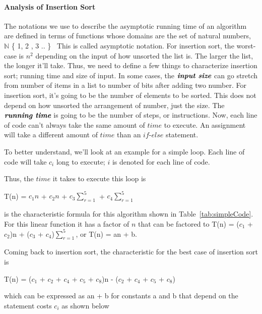 \documentclass[12pt]{article}
\begin{document}
	\paragraph{Analysis of Insertion Sort}
	
	The notations we use to describe the asymptotic running time of an algorithm are defined in terms of functions whose domains are the set of natural numbers, $\mathbb{N}$ \{ 1, 2 , 3 .. \}~\cite[p.~43]{intro}
	This is called asymptotic notation.
	For insertion sort, the worst-case is $n^2$ depending on the input of how unsorted the list is.
	The larger the list, the longer it'll take. Thus, we need to define a few things to characterize insertion sort; running time and size of input.
	In some cases, the $\textit{\textbf{input size}}$ can go stretch from number of items in a list to number of bits after adding two number. 
	For insertion sort, it’s going to be the number of elements to be sorted.
	This does not depend on how unsorted the arrangement of number, just the size.
	The $\textit{\textbf{running time}}$ is going to be the number of steps, or instructions.
	Now, each line of code can't always take the same amount of $\textit{time}$ to execute.
	An assignment will take a different amount of $\textit{time}$ than an $\textit{if-else}$ statement.
	
	To better understand, we’ll look at an example for a simple loop.
	Each line of code will take $c_i$ long to execute; $i$ is denoted for each line of code.
	
	
	
	Thus, the $\textit{time}$ it takes to execute this loop is
	\begin{center}
		T(n) = $c_1n$ + $c_2n$ + $c_3\sum_{r=1}^{5}$ + $c_4\sum_{r=1}^{5}$
	\end{center}
	is the characteristic formula for this algorithm shown in Table~\ref{tab:simpleCode}.
	For this linear function it has a factor of $n$ that can be factored to T(n) = ($c_1$ + $c_2$)n + ($c_3$ + $c_4$)$\sum_{r=1}^{5}$, or T(n) = an + b.
	
	Coming back to insertion sort, the characteristic for the best case of insertion sort is
	\begin{center}
		T(n) = ($c_1$ + $c_2$ + $c_4$ + $c_5$ + $c_8$)n - ($c_2$ + $c_4$ + $c_5$ + $c_8$)
	\end{center}
	which can be expressed as an + b for constants a and b that depend on the statement costs $c_i$ as shown below
	
	
	
\end{document}
